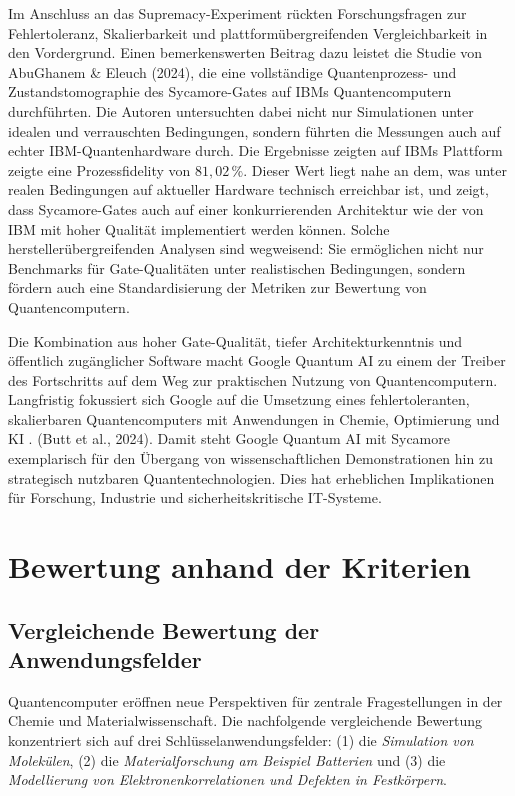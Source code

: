 Im Anschluss an das Supremacy-Experiment rückten Forschungsfragen zur Fehlertoleranz, Skalierbarkeit und plattformübergreifenden Vergleichbarkeit in den Vordergrund. Einen bemerkenswerten Beitrag dazu leistet die Studie von AbuGhanem & Eleuch (2024), die eine vollständige Quantenprozess- und Zustandstomographie des Sycamore-Gates auf IBMs Quantencomputern durchführten. \cite{abughanemPhotonicQuantumComputers2024} Die Autoren untersuchten dabei nicht nur Simulationen unter idealen und verrauschten Bedingungen, sondern führten die Messungen auch auf echter IBM-Quantenhardware durch. Die Ergebnisse zeigten auf IBMs Plattform zeigte eine Prozessfidelity von \(81{,}02\,\%\). Dieser Wert liegt nahe an dem, was unter realen Bedingungen auf aktueller Hardware technisch erreichbar ist, und zeigt, dass Sycamore-Gates auch auf einer konkurrierenden Architektur wie der von IBM mit hoher Qualität implementiert werden können. \cite{abughanem_full_2025}
Solche herstellerübergreifenden Analysen sind wegweisend: Sie ermöglichen nicht nur Benchmarks für Gate-Qualitäten unter realistischen Bedingungen, sondern fördern auch eine Standardisierung der Metriken zur Bewertung von Quantencomputern. \cite{abughanemPhotonicQuantumComputers2024}

Die Kombination aus hoher Gate-Qualität, tiefer Architekturkenntnis und öffentlich zugänglicher Software macht Google Quantum AI zu einem der Treiber des Fortschritts auf dem Weg zur praktischen Nutzung von Quantencomputern. Langfristig fokussiert sich Google auf die Umsetzung eines fehlertoleranten, skalierbaren Quantencomputers mit Anwendungen in Chemie, Optimierung und KI \cite{}. (Butt et al., 2024).
Damit steht Google Quantum AI mit Sycamore exemplarisch für den Übergang von wissenschaftlichen Demonstrationen hin zu strategisch nutzbaren Quantentechnologien. Dies hat erheblichen Implikationen für Forschung, Industrie und sicherheitskritische IT-Systeme.


\section{Bewertung anhand der Kriterien}

\subsection{Vergleichende Bewertung der Anwendungsfelder}

Quantencomputer eröffnen neue Perspektiven für zentrale Fragestellungen in der Chemie und Materialwissenschaft. Die nachfolgende vergleichende Bewertung konzentriert sich auf drei Schlüsselanwendungsfelder: (1) die \textit{Simulation von Molekülen}, (2) die \textit{Materialforschung am Beispiel Batterien} und (3) die \textit{Modellierung von Elektronenkorrelationen und Defekten in Festkörpern}.

